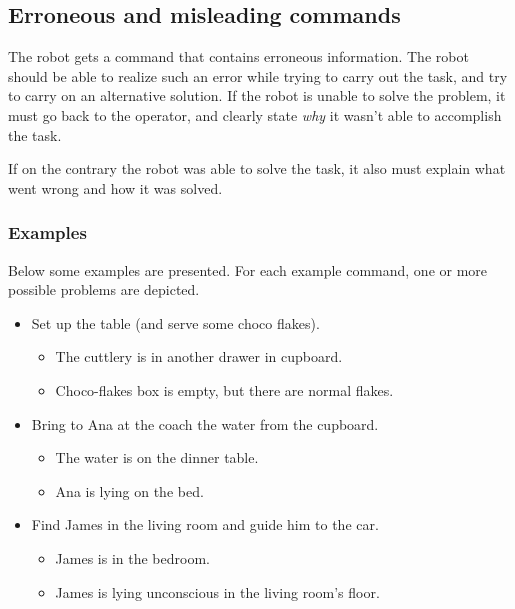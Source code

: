 %
%
\subsection{Erroneous and misleading commands}
\label{sec:eegpsr-erroneous-command}
The robot gets a command that contains erroneous information. The robot should be able to realize such an error while trying to carry out the task, and try to carry on an alternative solution. If the robot is unable to solve the problem, it must go back to the operator, and clearly state \textit{why} it wasn't able to accomplish the task.

If on the contrary the robot was able to solve the task, it also must explain what went wrong and how it was solved.

\subsubsection{Examples}
Below some examples are presented. For each example command, one or more possible problems are depicted.
\begin{itemize}
	\item Set up the table (and serve some choco flakes).
	\begin{itemize}
		\item The cuttlery is in another drawer in cupboard.
		\item Choco-flakes box is empty, but there are normal flakes.
	\end{itemize}

	\item Bring to Ana at the coach the water from the cupboard.
	\begin{itemize}
		\item The water is on the dinner table.
		\item Ana is lying on the bed.
	\end{itemize}

	\item Find James in the living room and guide him to the car.
	\begin{itemize}
		\item James is in the bedroom.
		\item James is lying unconscious in the living room's floor.
	\end{itemize}
\end{itemize}


